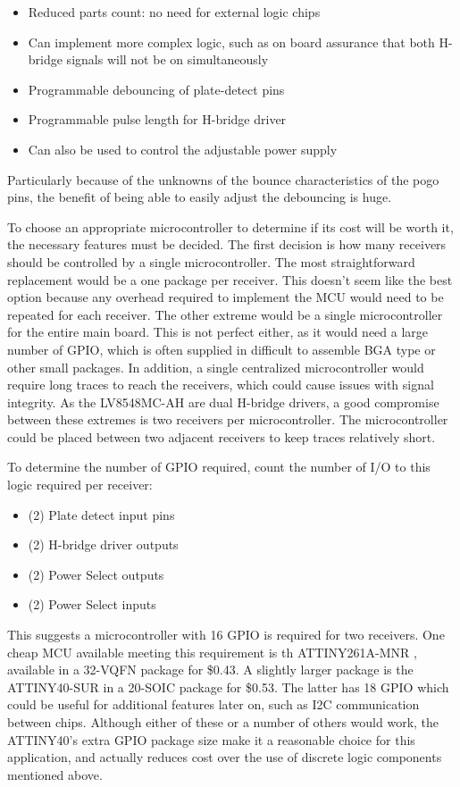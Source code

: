 \documentclass{article}
\begin{document}
		\begin{itemize}
			\item Reduced parts count: no need for external logic chips
			\item Can implement more complex logic, such as on board assurance that both H-bridge signals will not be on simultaneously
			\item Programmable debouncing of plate-detect pins
			\item Programmable pulse length for H-bridge driver
			\item Can also be used to control the adjustable power supply
		\end{itemize}

		Particularly because of the unknowns of the bounce characteristics of the pogo pins, the benefit of being able to easily adjust the debouncing is huge.

		To choose an appropriate microcontroller to determine if its cost will be worth it, the necessary features must be decided.  The first decision is how many receivers should be controlled by a single microcontroller.  The most straightforward replacement would be a one package per receiver.  This doesn't seem like the best option because any overhead required to implement the MCU would need to be repeated for each receiver.  The other extreme would be a single microcontroller for the entire main board.  This is not perfect either, as it would need a large number of GPIO, which is often supplied in difficult to assemble BGA type or other small packages.  In addition, a single centralized microcontroller would require long traces to reach the receivers, which could cause issues with signal integrity.  As the LV8548MC-AH are dual H-bridge drivers, a good compromise between these extremes is two receivers per microcontroller.  The microcontroller could be placed between two adjacent receivers to keep traces relatively short.

		To determine the number of GPIO required, count the number of I/O to this logic required per receiver:

		\begin{itemize}
			\item (2) Plate detect input pins
			\item (2) H-bridge driver outputs
			\item (2) Power Select outputs
			\item (2) Power Select inputs
		\end{itemize}

		This suggests a microcontroller with 16 GPIO is required for two receivers.  One cheap MCU available meeting this requirement is th ATTINY261A-MNR \cite{ATTINY261Adatasheet}, available in a 32-VQFN package for \$0.43.  A slightly larger package is the ATTINY40-SUR \cite{ATTINY40datasheet} in a 20-SOIC package for \$0.53.  The latter has 18 GPIO which could be useful for additional features later on, such as I2C communication between chips.  Although either of these or a number of others would work, the ATTINY40's extra GPIO package size make it a reasonable choice for this application, and actually reduces cost over the use of discrete logic components mentioned above.
\end{document}
